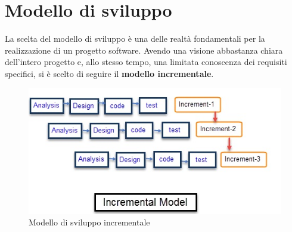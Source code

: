\section{Modello di sviluppo}
La scelta del modello di sviluppo è una delle realtà fondamentali per la realizzazione di un progetto software.
Avendo una visione abbastanza chiara dell'intero progetto e, allo stesso tempo, una limitata conoscenza dei requisiti specifici, si è scelto di seguire il \textbf{modello incrementale}.

\begin{figure}[H]
	\includegraphics[width=0.99\linewidth]{res/images/incremental_model.jpg}
	\caption{Modello di sviluppo incrementale}
\end{figure}

